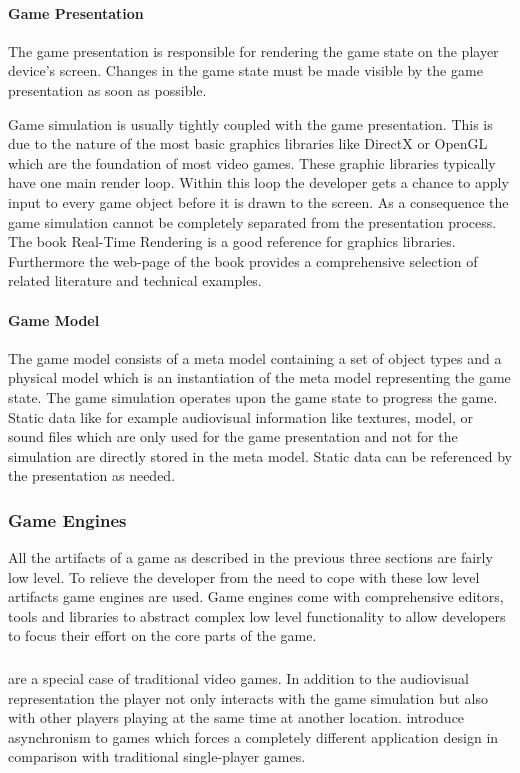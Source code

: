 \paragraph{Game Presentation}

The game presentation is responsible for rendering the game state on the player
device's screen. Changes in the game state must be made visible by the game
presentation as soon as possible.

Game simulation is usually tightly coupled with the game presentation. This is
due to the nature of the most basic graphics libraries like DirectX or OpenGL
which are the foundation of most video games. These graphic libraries typically
have one main render loop. Within this loop the developer gets a chance to apply
input to every game object before it is drawn to the screen. As a consequence
the game simulation cannot be completely separated from the presentation
process. The book Real-Time Rendering \cite{RTR3} is a good reference for
graphics libraries. Furthermore the web-page of the book provides a
comprehensive selection of related literature and technical examples.

\paragraph{Game Model}

The game model consists of a meta model containing a set of object types and a
physical model which is an instantiation of the meta model representing the game
state. The game simulation operates upon the game state to progress the game.
Static data like for example audiovisual information like textures, model, or
sound files which are only used for the game presentation and not for the
simulation are directly stored in the meta model. Static data can be referenced
by the presentation as needed.

\subsubsection{Game Engines}
All the artifacts of a game as described in the previous three sections are
fairly low level. To relieve the developer from the need to cope with these low
level artifacts game engines are used. Game engines come with comprehensive
editors, tools and libraries to abstract complex low level functionality to
allow developers to focus their effort on the core parts of the game.

\subsubsection{\ogs{}}
\ogs{} are a special case of traditional video games. In addition to the
audiovisual representation the player not only interacts with the game
simulation but also with other players playing at the same time at another
location. \ogs{} introduce asynchronism to games which forces a completely
different application design in comparison with traditional single-player games.


